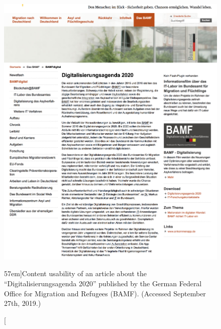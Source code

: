 \begin{figure}%
  \includegraphics[width=1.54\textwidth]{../figures/content_usability_bamf.png}
  \caption[][57em]{Content usability of an article about the ``Digitalisierungsagenda 2020'' published by the German Federal Office for Migration and Refugees (BAMF). (Accessed September 27th, 2019.) }
  \label{fig:content_usability_bamf}
\end{figure}

